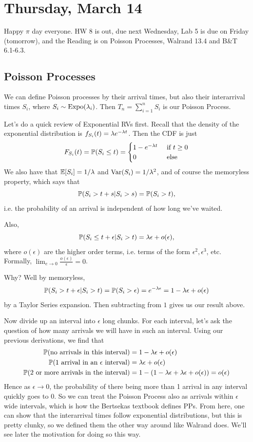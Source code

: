 \documentclass[11 pt]{scrartcl}
\begin{document}
\newpage 
\section{Thursday, March 14} 
Happy $\pi$ day everyone. HW 8 is out, due next Wednesday, Lab 5 is due on Friday (tomorrow), and the Reading is on Poisson Processes, Walrand 13.4 and B\&T 6.1-6.3. 

\subsection{Poisson Processes}
We can define Poisson processes by their arrival times, but also their interarrival times $S_i$, where $S_i \sim \text{Expo}(\lambda_i)$. Then $T_n = \sum_{i = 1}^n S_i$ is our Poisson Process. 

Let's do a quick review of Exponential RVs first. Recall that the density of the exponential distribution is $f_{S_i}(t) = \lambda e^{-\lambda t}$. Then the CDF is just 
\[ F_{S_i}(t) = \mathbb P(S_i \leq t) = \begin{cases}
        1 - e^{-\lambda t} &\text{ if } t\geq 0 \\ 
        0 &\text{ else }
    \end{cases} 
\] 
We also have that $\mathbb E[S_i] = 1/\lambda$ and $\text{Var}(S_i) = 1/\lambda^2$, and of course the memoryless property, which says that 
\[ \mathbb P(S_i > t + s | S_i > s) = \mathbb P(S_i > t),\] 
i.e. the probability of an arrival is independent of how long we've waited. 

Also, 
\[ \mathbb P(S_i \leq t + \epsilon | S_i > t) = \lambda\epsilon + o(\epsilon),\] 
where $o(\epsilon)$ are the higher order terms, i.e. terms of the form $\epsilon^2, \epsilon^3$, etc. Formally, $\lim_{e\to 0} \frac{o(\epsilon)}{\epsilon} = 0$. 

Why? Well by memoryless, 
\[ \mathbb P(S_i > t + \epsilon | S_i > t) = \mathbb P(S_i > \epsilon) = e^{-\lambda \epsilon} = 1 - \lambda\epsilon + o(\epsilon)\] 
by a Taylor Series expansion. Then subtracting from $1$ gives us our result above. 

Now divide up an interval into $\epsilon$ long chunks. For each interval, let's ask the question of how many arrivals we will have in such an interval. Using our previous derivations, we find that 
\begin{align*}
    \mathbb P(\text{no arrivals in this interval}) &= 1- \lambda\epsilon + o(\epsilon) \\ 
    \mathbb P(\text{1 arrival in an }\epsilon \text{ interval}) &= \lambda\epsilon + o(\epsilon) \\ 
    \mathbb P(\text{2 or more arrivals in the interval}) &= 1 - (1-\lambda\epsilon + \lambda\epsilon + o(\epsilon)) = o(\epsilon)
\end{align*}
Hence as $\epsilon \to 0$, the probability of there being more than 1 arrival in any interval quickly goes to $0$. So we can treat the Poisson Process also as arrivals within $\epsilon$ wide intervals, which is how the Bertsekas textbook defines PPs. From here, one can show that the interarrival times follow exponential distributions, but this is pretty clunky, so we defined them the other way around like Walrand does. We'll see later the motivation for doing so this way. 
\end{document}
